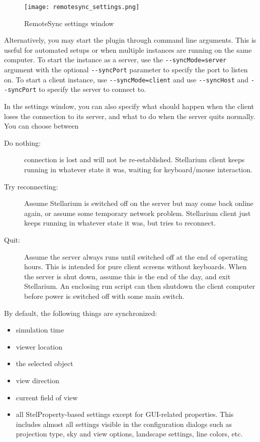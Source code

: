 \begin{figure}[htb]
	\centering\texttt{[image: remotesync\_settings.png]}
	\caption{RemoteSync settings window}
	\label{fig:plugins:RemoteSync:settings}
\end{figure}

Alternatively, you may start the plugin through command line arguments. This is
useful for automated setups or when multiple instances are running on the same
computer. To start the instance as a server, use the
\texttt{-{}-syncMode=server} argument with the optional \texttt{-{}-syncPort}
parameter to specify the port to listen on. To start a client instance, use
\texttt{-{}-syncMode=client} and use \texttt{-{}-syncHost} and
\texttt{-{}-syncPort} to specify the server to connect to.

In the settings window, you can also specify what should happen when the client 
loses the connection to its server, and what to do when the server quits 
normally. You can choose between 
\begin{description}
\item[Do nothing:] connection is lost and will not be re-established. Stellarium client keeps running 
     in whatever state it was, waiting for keyboard/mouse interaction. 
\item[Try reconnecting:] Assume Stellarium is switched off on the server
      but may come back online again, or assume some temporary network problem. 
	  Stellarium client just keeps running in whatever state it was, but tries to reconnect.
\item[Quit:] Assume the server always runs until switched off at the end of operating hours. 
      This is intended for pure client screens without keyboards. When the server  
	  is shut down, assume this is the end of the day, and exit Stellarium. An enclosing run script 
	  can then shutdown the client computer before power is switched off with some main switch. 
\end{description}
By default, the following things are synchronized:
\begin{itemize}
	\item simulation time
	\item viewer location
	\item the selected object
	\item view direction
	\item current field of view
	\item all StelProperty-based settings except for GUI-related properties. 
	This includes almost all settings visible in the configuration dialogs such 
	as projection type, sky and view options, landscape settings, line colors, etc.
\end{itemize}

